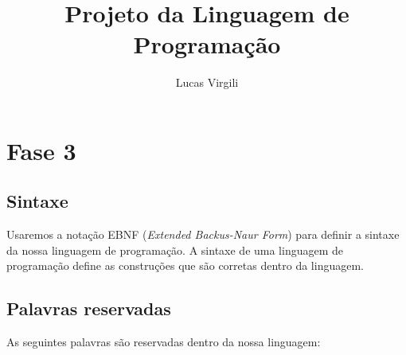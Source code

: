 \documentclass[a4 paper, 12pt]{article}
\title{Projeto da Linguagem de Programa\c c\~ao}
\author{Lucas Virgili}
\date{}
\begin{document}
\maketitle
\tableofcontents
\section{Fase 3}
\subsection{Sintaxe}

Usaremos a nota\c c\~ao EBNF (\emph{Extended Backus-Naur Form}) para
definir a sintaxe da nossa linguagem de programa\c c\~ao. A sintaxe de
uma linguagem de programa\c c\~ao define as constru\c c\~oes que s\~ao
corretas dentro da linguagem.

\subsection{Palavras reservadas}

As seguintes palavras s\~ao reservadas dentro da nossa linguagem:
\end{document}
